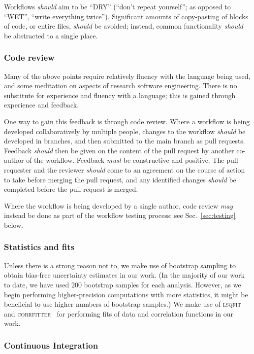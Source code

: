 \documentclass{article}
\newcommand\rfcword[1]{\emph{#1}\xspace}
\newcommand\must{\rfcword{must}}
\newcommand\should{\rfcword{should}}
\newcommand\may{\rfcword{may}}
\newcommand\program[1]{\textsc{#1}\xspace}
\begin{document}
Workflows \should aim to be ``DRY''
(``don't repeat yourself'';
as opposed to ``WET'',
``write everything twice'').
Significant amounts of copy-pasting of blocks of code,
or entire files,
\should be avoided;
instead,
common functionality \should be abstracted to a single place.


\subsubsection{Code review}\label{sec:code-review}

Many of the above points require relatively fluency with the language being used,
and some meditation on aspects of research software engineering.
There is no substitute for experience and fluency with a language;
this is gained through experience and feedback.

One way to gain this feedback is through code review.
Where a workflow is being developed collaboratively by multiple people,
changes to the workflow \should be developed in branches,
and then submitted to the main branch as pull requests.
Feedback \should then be given on the content of the pull request
by another co-author of the workflow.
Feedback \must be constructive and positive.
The pull requester and the reviewer \should come to an agreement on
the course of action to take before merging the pull request,
and any identified changes \should be completed before the pull request is merged.

Where the workflow is being developed by a single author,
code review \may instead be done as part of the workflow testing process;
see Sec.~\ref{sec:testing} below.

\subsubsection{Statistics and fits}

Unless there is a strong reason not to,
we make use of bootstrap sampling
to obtain bias-free uncertainty estimates in our work.
(In the majority of our work to date,
we have used 200 bootstrap samples for each analysis.
However,
as we begin performing higher-precision computations with more statistics,
it might be beneficial to use higher numbers of bootstrap samples.)
We make use of
\program{lsqfit}~\cite{lsqfit,peter_lepage_2024_12690493}
and \program{corrfitter}~\cite{corrfitter,peter_lepage_2021_5733391}
for performing fits of data and correlation functions in our work.

\subsubsection{Continuous Integration}
\end{document}
